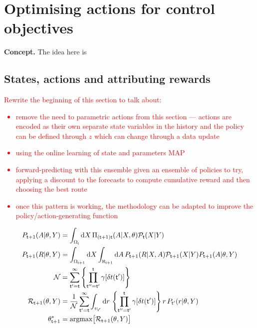 \chapter{\sffamily Optimising actions for control objectives}

{\bfseries\sffamily Concept.} The idea here is 

\section{\sffamily States, actions and attributing rewards}

\textcolor{red}{Rewrite the beginning of this section to talk about:
\begin{itemize}
\item{remove the need to parametric actions from this section --- actions are encoded as their own separate state variables in the history and the policy can be defined through $z$ which can change through a data update}
\item{using the online learning of state and parameters MAP}
\item{forward-predicting with this ensemble given an ensemble of policies to try, applying a discount to the forecasts to compute cumulative reward and then choosing the best route}
\item{once this pattern is working, the methodology can be adapted to improve the policy/action-generating function}    
\end{itemize}
\begin{align}
P_{{\sf t}+1}(A\vert \theta,Y) &= \int_{\Omega_{{\sf t}}} {\rm d}X \, \Pi_{({\sf t}+1){\sf t}}(A\vert X,\theta){\cal P}_{{\sf t}}(X\vert Y) \\
P_{{\sf t}+1}(R\vert \theta, Y) &= \int_{\Omega_{{\sf t}+1}} {\rm d}X \int_{\aleph_{{\sf t}+1}} {\rm d}A  \, P_{{\sf t}+1}(R\vert X, A){\cal P}_{{\sf t}+1}(X\vert Y)P_{{\sf t}+1}(A\vert \theta,Y) \\
{\cal N} &= \sum_{{\sf t}'={\sf t}}^{\infty}\left\{ \prod_{{\sf t}''={\sf t}'}^{{\sf t}} \gamma [\delta t({\sf t}')] \right\} \\
{\cal R}_{{\sf t}+1}(\theta, Y) &= \frac{1}{{\cal N}}\sum_{{\sf t}'={\sf t}}^{\infty}\int_{\upsilon_{{\sf t}'}} {\rm d}r \,\left\{ \prod_{{\sf t}''={\sf t}'}^{{\sf t}} \gamma [\delta t({\sf t}')] \right\} r \,P_{{\sf t}'}(r\vert \theta, Y) \\
\theta^*_{{\sf t}+1} &= {\rm argmax} \big[ {\cal R}_{{\sf t}+1}(\theta, Y)\big]
\end{align}
}

